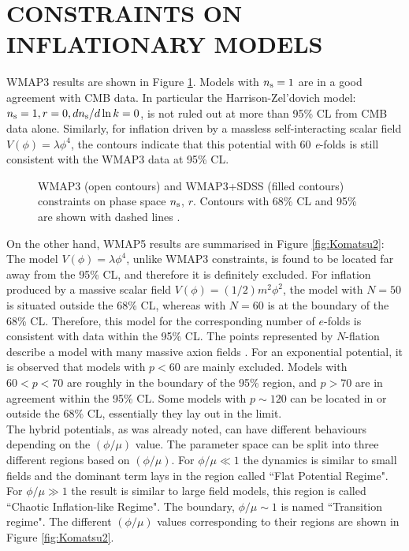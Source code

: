 \documentclass{rmaa}
\begin{document}
\section{CONSTRAINTS ON INFLATIONARY MODELS}

WMAP3 results are shown in Figure \ref{fig:Kinney2}. Models with $n_{\rm s}=1$ are in a 
good agreement with CMB data. In particular the Harrison-Zel'dovich model: $n_{\rm s}=1, 
r=0, dn_{\rm s}/d \ln k=0$, is not ruled out at more than 95\% CL from CMB data alone.
Similarly, for inflation driven by a massless self-interacting scalar field
$V(\phi) = \lambda\phi^4$,  the contours indicate that this potential
with 60 \textit{e}-folds is still consistent with the WMAP3 data at 95\% CL. 
\\

\begin{figure}[h!] 
\centerline{ \epsfxsize=220pt  }
\caption{WMAP3 (open contours) and 
WMAP3+SDSS (filled contours) constraints on phase space $n_{\rm s}$, $r$. Contours with 68\% CL 
and 95\% are shown with dashed lines \citep{Kinney}.}
\label{fig:Kinney2}
\end{figure}


On the other hand, WMAP5 results are summarised in Figure \ref{fig:Komatsu2}:
The model $V(\phi)=\lambda \phi^4$, unlike WMAP3 constraints, is found to be located 
far away from the 95\% CL, and therefore it is definitely excluded. For inflation produced by a massive 
scalar field $V(\phi)=(1/2)m^2\phi^2$, the model with $N=50$ is situated outside the 
68\% CL, whereas with $N=60$ is at the boundary of the 68\% CL. 
Therefore, this model for the corresponding number of $e$-folds is consistent with data within the 95\% CL. 
The points represented by $N$-flation describe a model with many massive axion fields \citep{Liddle3}. 
For an exponential potential, it is observed that models with $p<60$ are mainly excluded.
Models with $60<p<70$ are roughly in the boundary of the 95\% region, and $p>70$ are 
in agreement within the 95\% CL. 
Some models with $p\sim 120$ can be located in or outside the 68\% CL, essentially
they lay out in the limit. 
\\

The hybrid potentials, as was already noted, can have different behaviours
depending on the $(\phi/ \mu)$ value. The parameter space can be split into three 
different regions based on $(\phi / \mu)$. For $\phi / \mu \ll 1$ the dynamics is similar to small
fields and the dominant term lays in the region called ``Flat Potential Regime". 
For $\phi / \mu \gg 1$ the result is similar to large field models, this region is called
``Chaotic Inflation-like Regime". The boundary, $\phi / \mu \sim 1$ is named 
``Transition regime". The different $(\phi / \mu)$ values corresponding to their regions
are shown in Figure \ref{fig:Komatsu2}.
  
\end{document}
